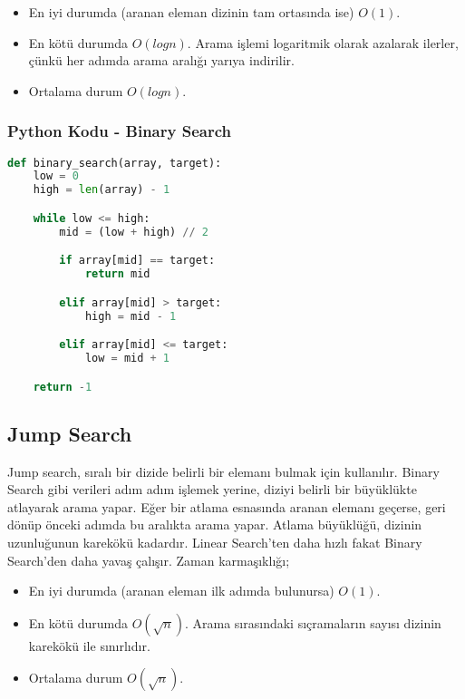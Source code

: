 \begin{itemize}
    \item En iyi durumda (aranan eleman dizinin tam ortasında ise) $O(1)$.
    \item En kötü durumda $O(logn)$. Arama işlemi logaritmik olarak azalarak ilerler, çünkü her adımda arama aralığı yarıya indirilir.
    \item Ortalama durum $O(logn)$.
\end{itemize}

\subsubsection{Python Kodu - Binary Search}

\begin{lstlisting}[language=Python]
def binary_search(array, target):
    low = 0
    high = len(array) - 1

    while low <= high:
        mid = (low + high) // 2

        if array[mid] == target:
            return mid

        elif array[mid] > target:
            high = mid - 1

        elif array[mid] <= target:
            low = mid + 1

    return -1
\end{lstlisting}

\newpage

\subsection{Jump Search}

Jump search, sıralı bir dizide belirli bir elemanı bulmak için kullanılır. Binary Search gibi verileri adım adım işlemek yerine, diziyi belirli bir büyüklükte atlayarak arama yapar. Eğer bir atlama esnasında aranan elemanı geçerse, geri dönüp önceki adımda bu aralıkta arama yapar. Atlama büyüklüğü, dizinin uzunluğunun karekökü kadardır. Linear Search'ten daha hızlı fakat Binary Search'den daha yavaş çalışır. Zaman karmaşıklığı;

\begin{itemize}
    \item En iyi durumda (aranan eleman ilk adımda bulunursa) $O(1)$.
    \item En kötü durumda $O(\sqrt{n})$. Arama sırasındaki sıçramaların sayısı dizinin karekökü ile sınırlıdır.
    \item Ortalama durum $O(\sqrt{n})$.
\end{itemize}

